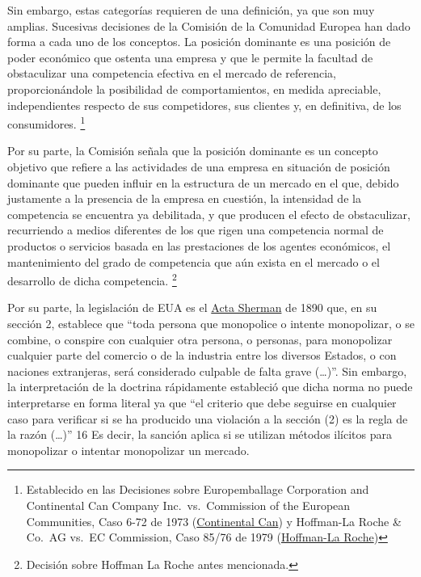 \documentclass[
  12pt,
  spanish,
]{book}
\begin{document}
Sin embargo, estas categorías requieren de una definición, ya que son muy amplias. Sucesivas decisiones de la Comisión de la Comunidad Europea han dado forma a cada uno de los conceptos. La posición dominante es una posición de poder económico que ostenta una empresa y que le permite la facultad de obstaculizar una competencia efectiva en el mercado de referencia, proporcionándole la posibilidad de comportamientos, en medida apreciable, independientes respecto de sus competidores, sus clientes y, en definitiva, de los consumidores.
\footnote{Establecido en las Decisiones sobre Europemballage Corporation and Continental Can Company Inc.~vs.~Commission of the European Communities, Caso 6-72 de 1973 (\href{https://eur-lex.europa.eu/legal-content/ES/TXT/PDF/?uri=CELEX:61972CJ0006\&from=EN}{Continental Can}) y Hoffman-La Roche \& Co.~AG vs.~EC Commission, Caso 85/76 de 1979 (\href{https://eur-lex.europa.eu/LexUriServ/LexUriServ.do?uri=CELEX:61976CJ0085:EN:PDF}{Hoffman-La Roche})}

Por su parte, la Comisión señala que la posición dominante es un concepto objetivo que refiere a las actividades de una empresa en situación de posición dominante que pueden influir en la estructura de un mercado en el que, debido justamente a la presencia de la empresa en cuestión, la intensidad de la competencia se encuentra ya debilitada, y que producen el efecto de obstaculizar, recurriendo a medios diferentes de los que rigen una competencia normal de productos o servicios basada en las prestaciones de los agentes económicos, el mantenimiento del grado de competencia que aún exista en el mercado o el desarrollo de dicha competencia.
\footnote{Decisión sobre Hoffman La Roche antes mencionada.}

Por su parte, la legislación de EUA es el \href{https://www.law.cornell.edu/uscode/text/15/1}{Acta Sherman} de 1890 que, en su sección 2, establece que ``toda persona que monopolice o intente monopolizar, o se combine, o conspire con cualquier otra persona, o personas, para monopolizar cualquier parte del comercio o de la industria entre los diversos Estados, o con naciones extranjeras, será considerado culpable de falta grave (\ldots)''. Sin embargo, la interpretación de la doctrina rápidamente estableció que dicha norma no puede interpretarse en forma literal ya que ``el criterio que debe seguirse en cualquier caso para verificar si se ha producido una violación a la sección (2) es la regla de la razón (\ldots)'' 16 Es decir, la sanción aplica si se utilizan métodos ilícitos para monopolizar o intentar monopolizar un mercado.
\end{document}

